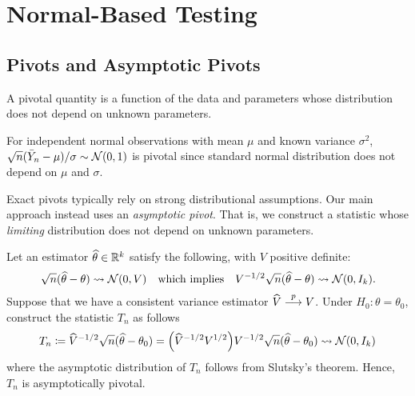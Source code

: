 \documentclass[a4paper,12pt]{article}
\begin{document}
\section{Normal-Based Testing}

\subsection{Pivots and Asymptotic Pivots}

\begin{definition}
	A pivotal quantity is a function of the data and parameters whose distribution does not depend on unknown parameters.
\end{definition}

\begin{example}
	For independent normal observations with mean $\mu$ and known variance $\sigma^2$,
	$\sqrt n(\bar Y_n-\mu)/\sigma\sim\operatorname{\mathcal{N}}(0,1)$ is pivotal
	since standard normal distribution does not depend on $\mu$ and $\sigma$.
\end{example}

\begin{remark}
	Exact pivots typically rely on strong distributional assumptions.
	Our main approach instead uses an \emph{asymptotic pivot}.
	That is, we construct a statistic whose \emph{limiting} distribution does not depend on unknown parameters.
\end{remark}

\begin{example}
	Let an estimator $\widehat\theta\in\mathbb{R}^k$ satisfy the following, with $V$ positive definite:
	\begin{align}
		\sqrt n(\widehat\theta-\theta)\overset{}{\leadsto}\operatorname{\mathcal{N}}(0,V)
		\quad\text{which implies}\quad
		V^{-1/2}\sqrt n(\widehat\theta-\theta)\overset{}{\leadsto}\operatorname{\mathcal{N}}(0,I_k).
	\end{align}
	Suppose that we have a consistent variance estimator $\widehat V\overset{p}{\longrightarrow} V$.
	Under $H_0:\theta=\theta_0$,
	construct the statistic $T_n$ as follows
	\begin{align}\label{eq-studentized-statistic}
		T_n
		\coloneqq \widehat V^{-1/2} \sqrt n(\widehat\theta-\theta_0)
		= \Big(\widehat V^{-1/2} V^{1/2}\Big) V^{-1/2} \sqrt n(\widehat\theta-\theta_0)
		\overset{}{\leadsto}\operatorname{\mathcal{N}}(0,I_k)
	\end{align}
	where the asymptotic distribution of $T_n$ follows from Slutsky's theorem.
	Hence, $T_n$ is asymptotically pivotal.
\end{example}
\end{document}

